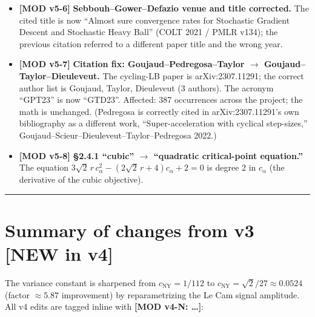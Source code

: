 \documentclass[11pt,a4paper]{article}
\theoremstyle{plain}
\theoremstyle{definition}
\theoremstyle{remark}
\begin{document}
\begin{itemize}[leftmargin=*]
  \item \textbf{[MOD v5-6]} \textbf{Sebbouh--Gower--Defazio venue and title corrected.} The cited title is now ``Almost sure convergence rates for Stochastic Gradient Descent and Stochastic Heavy Ball'' (COLT 2021 / PMLR v134); the previous citation referred to a different paper title and the wrong year.
  \item \textbf{[MOD v5-7]} \textbf{Citation fix: Goujaud--Pedregosa--Taylor $\to$ Goujaud--Taylor--Dieuleveut.} The cycling-LB paper is arXiv:2307.11291; the correct author list is Goujaud, Taylor, Dieuleveut (3 authors). The acronym ``GPT23'' is now ``GTD23''. Affected: 387 occurrences across the project; the math is unchanged. (Pedregosa is correctly cited in arXiv:2307.11291's own bibliography as a different work, ``Super-acceleration with cyclical step-sizes,'' Goujaud--Scieur--Dieuleveut--Taylor--Pedregosa 2022.)
  \item \textbf{[MOD v5-8]} \textbf{\S2.4.1 ``cubic'' $\to$ ``quadratic critical-point equation.''} The equation $3\sqrt 2\, r\, c_\alpha^2 - (2\sqrt 2\, r + 4) c_\alpha + 2 = 0$ is degree 2 in $c_\alpha$ (the derivative of the cubic objective).
\end{itemize}

\bigskip
\hrule
\bigskip

\section*{Summary of changes from v3 [NEW in v4]}

The variance constant is sharpened from $c_{\mathrm{NY}} = 1/112$ to $c_{\mathrm{NY}} = \sqrt 2/27 \approx 0.0524$ (factor $\approx 5.87$ improvement) by reparametrizing the Le Cam signal amplitude. All v4 edits are tagged inline with \textbf{[MOD v4-N: \ldots]}:
\end{document}
